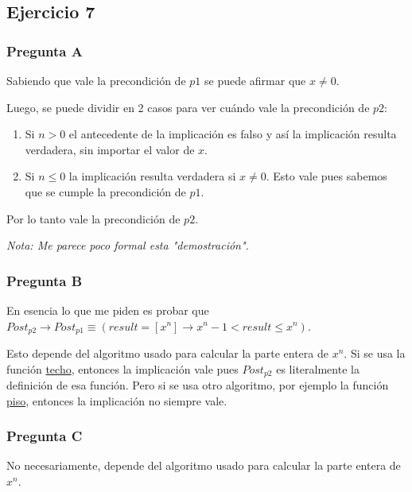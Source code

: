 \subsection{Ejercicio 7}

\subsubsection{Pregunta A}

Sabiendo que vale la precondición de $p1$ se puede afirmar que $x \neq 0$.

Luego, se puede dividir en 2 casos para ver cuándo vale la precondición de $p2$:

\begin{enumerate}[1)]
    \item Si $n > 0$ el antecedente de la implicación es falso y así la implicación resulta verdadera, sin importar el valor de $x$.
    \item Si $n \leq 0$ la implicación resulta verdadera si $x \neq 0$. Esto vale pues sabemos que se cumple la precondición de $p1$.
\end{enumerate}

Por lo tanto vale la precondición de $p2$.

{\em Nota: Me parece poco formal esta "demostración".}

\subsubsection{Pregunta B}

En esencia lo que me piden es probar que $Post_{p2} \rightarrow Post_{p1} \equiv (result = [x^n] \rightarrow x^n - 1 < result \leq x^n)$.

Esto depende del algoritmo usado para calcular la parte entera de $x^n$. Si se usa la función \href{https://es.wikipedia.org/wiki/Funciones_de_parte_entera#Funci%C3%B3n_techo}{techo}, entonces la implicación vale pues $Post_{p2}$ es literalmente la definición de esa función. Pero si se usa otro algoritmo, por ejemplo la función \href{https://es.wikipedia.org/wiki/Funciones_de_parte_entera#Funci%C3%B3n_piso/suelo}{piso}, entonces la implicación no siempre vale.

\subsubsection{Pregunta C}

No necesariamente, depende del algoritmo usado para calcular la parte entera de $x^n$.

